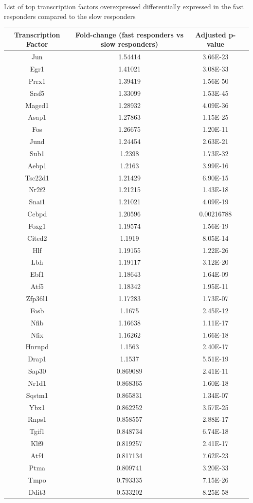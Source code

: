 \begin{supptable}[p]
\centering
\caption{List of top transcription factors overexpressed differentially expressed in the fast responders compared to the slow responders}
\begin{tabular}{ cccc }
\toprule
\textbf{Transcription Factor} & \textbf{Fold-change (fast responders vs slow responders)} & \textbf{Adjusted p-value} \\
\midrule
Jun & 1.54414 & 3.66E-23 \\
Egr1 & 1.41021 & 3.08E-33 \\
Prrx1 & 1.39419 & 1.56E-50 \\
Srsf5 & 1.33099 & 1.53E-45 \\
Maged1 & 1.28932 & 4.09E-36 \\
Asap1 & 1.27863 & 1.15E-25 \\
Fos & 1.26675 & 1.20E-11 \\
Jund & 1.24454 & 2.63E-21 \\
Sub1 & 1.2398 & 1.73E-32 \\
Aebp1 & 1.2163 & 3.99E-16 \\
Tsc22d1 & 1.21429 & 6.90E-15 \\
Nr2f2 & 1.21215 & 1.43E-18 \\
Snai1 & 1.21021 & 4.09E-19 \\
Cebpd & 1.20596 & 0.00216788 \\
Foxg1 & 1.19574 & 1.56E-19 \\
Cited2 & 1.1919 & 8.05E-14 \\
Hlf & 1.19155 & 1.22E-26 \\
Lbh & 1.19117 & 3.12E-20 \\
Ebf1 & 1.18643 & 1.64E-09 \\
Atf5 & 1.18342 & 1.95E-11 \\
Zfp36l1 & 1.17283 & 1.73E-07 \\
Fosb & 1.1675 & 2.45E-12 \\
Nfib & 1.16638 & 1.11E-17 \\
Nfix & 1.16262 & 1.66E-18 \\
Hnrnpd & 1.1563 & 2.40E-17 \\
Drap1 & 1.1537 & 5.51E-19 \\
Sap30 & 0.869089 & 2.41E-11 \\
Nr1d1 & 0.868365 & 1.60E-18 \\
Sqstm1 & 0.865831 & 1.34E-07 \\
Ybx1 & 0.862252 & 3.57E-25 \\
Rnps1 & 0.858557 & 2.88E-17 \\
Tgif1 & 0.848734 & 6.74E-18 \\
Klf9 & 0.819257 & 2.41E-17 \\
Atf4 & 0.817134 & 7.62E-23 \\
Ptma & 0.809741 & 3.20E-33 \\
Tmpo & 0.793335 & 7.15E-26 \\
Ddit3 & 0.533202 & 8.25E-58 \\
\bottomrule
\end{tabular}
\label{tab:hedgehog_tableS1}
\end{supptable}

